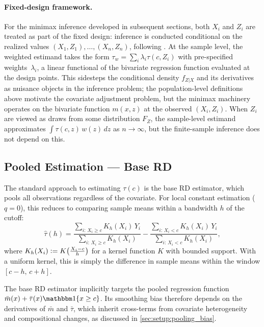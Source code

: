 \paragraph{Fixed-design framework.}
For the minimax inference developed in subsequent sections, both $X_i$ and $Z_i$ are treated as part of the fixed design: inference is conducted conditional on the realized values $(X_1, Z_1), \ldots, (X_n, Z_n)$, following \textcite{armstrong_simple_2018}.
At the sample level, the weighted estimand takes the form $\tau_w = \sum_i \lambda_i \tau(c, Z_i)$ with pre-specified weights~$\lambda_i$, a linear functional of the bivariate regression function evaluated at the design points.
This sidesteps the conditional density $f_{Z|X}$ and its derivatives as nuisance objects in the inference problem; the population-level definitions above motivate the covariate adjustment problem, but the minimax machinery operates on the bivariate function $m(x,z)$ at the observed $(X_i, Z_i)$.
When $Z_i$ are viewed as draws from some distribution $F_Z$, the sample-level estimand approximates $\int \tau(c,z)\, w(z)\, dz$ as $n \to \infty$, but the finite-sample inference does not depend on this.


\subsection{Pooled Estimation --- Base RD}\label{sec:setup:base}

The standard approach to estimating $\tau(c)$ is the base RD estimator, which pools all observations regardless of the covariate.
For local constant estimation ($q = 0$), this reduces to comparing sample means within a bandwidth $h$ of the cutoff:
\begin{equation}\label{eq:base_rd}
	\hat{\tau}(h) = \frac{\sum_{i:\, X_i \geq c} K_h(X_i)\, Y_i}{\sum_{i:\, X_i \geq c} K_h(X_i)} - \frac{\sum_{i:\, X_i < c} K_h(X_i)\, Y_i}{\sum_{i:\, X_i < c} K_h(X_i)},
\end{equation}
where $K_h(X_i) \vcentcolon= K\!\left(\frac{X_i - c}{h}\right)$ for a kernel function $K$ with bounded support.
With a uniform kernel, this is simply the difference in sample means within the window $[c - h,\, c + h]$.

The base RD estimator implicitly targets the pooled regression function $\bar{m}(x) + \bar{\tau}(x) \ind\{x \geq c\}$.
Its smoothing bias therefore depends on the derivatives of $\bar{m}$ and $\bar{\tau}$, which inherit cross-terms from covariate heterogeneity and compositional changes, as discussed in \cref{sec:setup:pooling_bias}.


